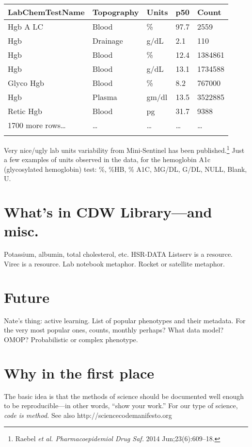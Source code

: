 \documentclass{tufte-handout}
\begin{document}
\noindent \begin{tabular}{lllll}
\\
\hline
LabChemTestName & Topography & Units & p50 & Count\\
\hline
Hgb A LC & Blood & \% & 97.7 & 2559\\
Hgb & Drainage & g/dL & 2.1 & 110\\
Hgb & Blood & \% & 12.4 & 1384861\\
Hgb & Blood & g/dL & 13.1 & 1734588\\
Glyco Hgb & Blood & \% & 8.2 & 767000\\
Hgb & Plasma & gm/dl & 13.5 & 3522885\\
Retic Hgb & Blood & pg & 31.7 & 9388\\
1700 more rows\ldots{} & \ldots{} & \ldots{} & \ldots{} & \ldots{} \\
\hline
\\
\end{tabular}


Very nice/ugly lab units variability from Mini-Sentinel has been
published.\footnote{Raebel \emph{et al. Pharmacoepidemiol Drug Saf.}
  2014 Jun;23(6):609--18.} Just a few examples of units observed in
the data, for the hemoglobin A1c (glycosylated hemoglobin) test: \%,
\%HB, \% A1C, MG/DL, G/DL, NULL, Blank, U.

\section{What's in CDW Library---and misc.}

Potassium, albumin, total cholesterol, etc. HSR-DATA Listserv is a
resource. Virec is a resource. Lab notebook metaphor. Rocket or
satellite metaphor.

\section{Future}

Nate's thing: active learning. List of popular phenotypes and their
metadata. For the very most popular ones, counts, monthly perhaps?
What data model? OMOP? Probabilistic or complex phenotype.

\section{Why in the first place}

The basic idea is that the methods of science should be documented
well enough to be reproducible---in other words, ``show your work.''
For our type of science, \emph{code is method.} See also
http://sciencecodemanifesto.org
\end{document}
